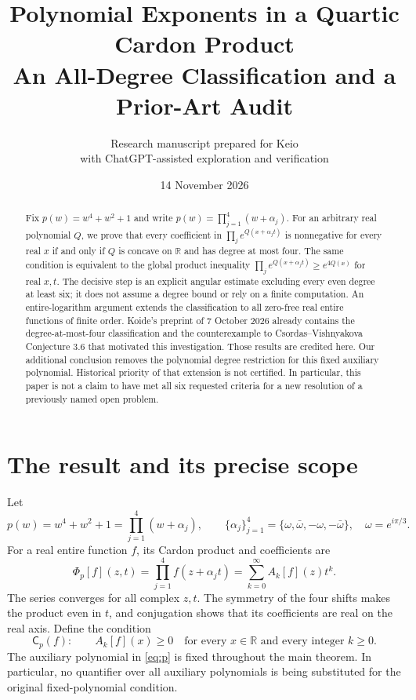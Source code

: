 \documentclass[11pt,a4paper]{article}
\title{\textbf{Polynomial Exponents in a Quartic Cardon Product}\\[6pt]
\large An All-Degree Classification and a Prior-Art Audit}
\author{Research manuscript prepared for Keio\\\small with ChatGPT-assisted exploration and verification}
\date{14 November 2026}
\theoremstyle{remark}\newtheorem{remark}[theorem]{Remark}
\newcommand{\R}{\mathbb R}\newcommand{\C}{\mathbb C}
\newcommand{\Ph}{\Phi_p}
\begin{document}
\maketitle
\begin{abstract}
Fix $p(w)=w^4+w^2+1$ and write $p(w)=\prod_{j=1}^4(w+\alpha_j)$.
For an arbitrary real polynomial $Q$, we prove that every coefficient in
$\prod_j e^{Q(x+\alpha_jt)}$ is nonnegative for every real $x$ if and only
if $Q$ is concave on $\R$ and has degree at most four. The same condition
is equivalent to the global product inequality
$\prod_j e^{Q(x+\alpha_jt)}\ge e^{4Q(x)}$ for real $x,t$.
The decisive step is an explicit angular estimate excluding every even
degree at least six; it does not assume a degree bound or rely on a
finite computation. An entire-logarithm argument extends the
classification to all zero-free real entire functions of finite order.
Koide's preprint of 7 October 2026 already contains the degree-at-most-four
classification and the counterexample to Csordas--Vishnyakova
Conjecture 3.6 that motivated this investigation. Those results are
credited here. Our additional conclusion removes the polynomial degree
restriction for this fixed auxiliary polynomial. Historical priority of
that extension is not certified. In particular, this paper is not a
claim to have met all six requested criteria for a new resolution of
a previously named open problem.
\end{abstract}

\section{The result and its precise scope}

Let
\begin{equation}\label{eq:p}
 p(w)=w^4+w^2+1=\prod_{j=1}^4(w+\alpha_j),\qquad
 \{\alpha_j\}_{j=1}^4=\{\omega,\bar\omega,-\omega,-\bar\omega\},
 \quad \omega=e^{i\pi/3}.
\end{equation}
For a real entire function $f$, its Cardon product and coefficients are
\begin{equation}\label{eq:cardon}
 \Ph[f](z,t)=\prod_{j=1}^4 f(z+\alpha_jt)
           =\sum_{k=0}^{\infty}A_k[f](z)t^k.
\end{equation}
The series converges for all complex $z,t$. The symmetry of the four
shifts makes the product even in $t$, and conjugation shows that its
coefficients are real on the real axis. Define the condition
\begin{equation}\label{eq:C}
 \mathsf C_p(f):\qquad A_k[f](x)\ge0
       \quad\text{for every }x\in\R\text{ and every integer }k\ge0.
\end{equation}
The auxiliary polynomial in \eqref{eq:p} is fixed throughout the main
theorem. In particular, no quantifier over all auxiliary polynomials is
being substituted for the original fixed-polynomial condition.
\end{document}
